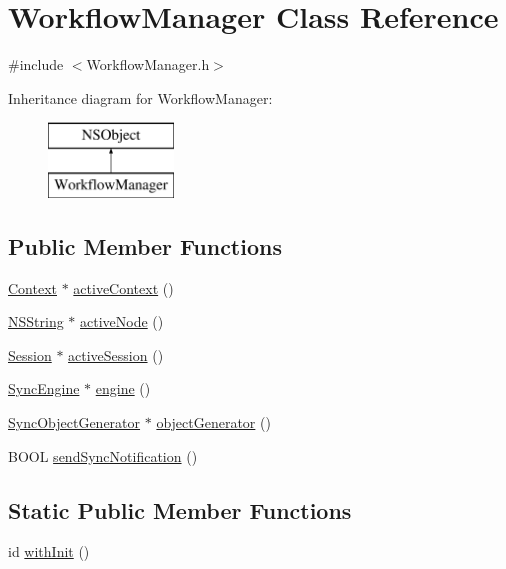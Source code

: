 \hypertarget{interface_workflow_manager}{
\section{\-Workflow\-Manager \-Class \-Reference}
\label{interface_workflow_manager}
}


{\ttfamily \#include $<$\-Workflow\-Manager.\-h$>$}

\-Inheritance diagram for \-Workflow\-Manager\-:\begin{figure}[H]
\begin{center}
\leavevmode
\includegraphics[height=2.000000cm]{interface_workflow_manager}
\end{center}
\end{figure}
\subsection*{\-Public \-Member \-Functions}
\begin{DoxyCompactItemize}
\item 
\hyperlink{interface_context}{\-Context} $\ast$ \hyperlink{interface_workflow_manager_a48b4a3909eaf8969b5676e52da63a514}{active\-Context} ()
\item 
\hyperlink{class_n_s_string}{\-N\-S\-String} $\ast$ \hyperlink{interface_workflow_manager_a6e656573bf5c5b3da41dc8ba6311f69e}{active\-Node} ()
\item 
\hyperlink{interface_session}{\-Session} $\ast$ \hyperlink{interface_workflow_manager_a773cb478e9b67a50f0bf1ce5218be365}{active\-Session} ()
\item 
\hyperlink{interface_sync_engine}{\-Sync\-Engine} $\ast$ \hyperlink{interface_workflow_manager_a227229236b70c9ac0e6135a236f6d360}{engine} ()
\item 
\hyperlink{interface_sync_object_generator}{\-Sync\-Object\-Generator} $\ast$ \hyperlink{interface_workflow_manager_a003c2fe4553cdabf8caa187b35680956}{object\-Generator} ()
\item 
\-B\-O\-O\-L \hyperlink{interface_workflow_manager_a7f2e42026223b1322dd24d5bc30c3acb}{send\-Sync\-Notification} ()
\end{DoxyCompactItemize}
\subsection*{\-Static \-Public \-Member \-Functions}
\begin{DoxyCompactItemize}
\item 
id \hyperlink{interface_workflow_manager_a7af94e5ecb6735c84e30b68d256b4559}{with\-Init} ()
\end{DoxyCompactItemize}


